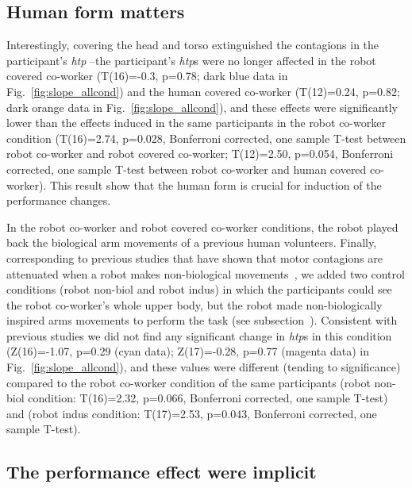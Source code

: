 \documentclass[a4paper, 12pt, oneside]{Thesis}  %
\begin{document}
\subsection{Human form matters}

Interestingly, covering the head and torso extinguished the contagions in the participant's {\it htp} --the participant's {\it htp}s were no longer affected in the robot covered co-worker (T(16)=-0.3, p=0.78; dark blue data in Fig.~\ref{fig:slope_allcond}) and the human covered co-worker (T(12)=0.24, p=0.82; dark orange data in Fig.~\ref{fig:slope_allcond}), and these effects were significantly lower than the effects induced in the same participants in the robot co-worker condition (T(16)=2.74, p=0.028, Bonferroni corrected, one sample T-test between robot co-worker and robot covered co-worker; T(12)=2.50, p=0.054, Bonferroni corrected, one sample T-test between robot co-worker and human covered co-worker). This result show that the human form is crucial for induction of the performance changes.

In the robot co-worker and robot covered co-worker conditions, the robot played back the biological arm movements of a previous human volunteers. Finally, corresponding to previous studies that have shown that motor contagions are attenuated when a robot makes non-biological movements~\cite{Kilner:CurBio:2003,Bisio:PlosOne:2014}, we added two control conditions (robot non-biol and robot indus) in which the participants could see the robot co-worker's whole upper body, but the robot made non-biologically inspired arms movements to perform the task (see subsection~). Consistent with previous studies we did not find any significant change in {\it htp}s in this condition (Z(16)=-1.07, p=0.29 (cyan data); Z(17)=-0.28, p=0.77 (magenta data) in Fig.~\ref{fig:slope_allcond}), and these values were different (tending to significance) compared to the robot co-worker condition of the same participants (robot non-biol condition: T(16)=2.32, p=0.066, Bonferroni corrected, one sample T-test) and (robot indus condition: T(17)=2.53, p=0.043, Bonferroni corrected, one sample T-test).


\subsection{The performance effect were implicit} \label{questionnaire}
\end{document}
